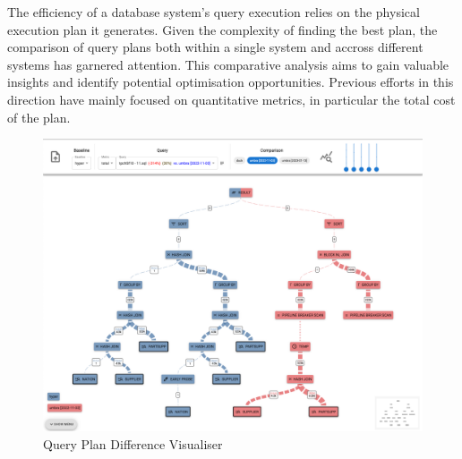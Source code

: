 The efficiency of a database system's query execution relies on the physical execution plan it generates.  Given the complexity of finding the best plan, the comparison of query plans both within a single system and accross different systems has garnered attention. This comparative analysis aims to gain valuable insights and identify potential optimisation opportunities. Previous efforts in this direction have mainly focused on quantitative metrics, in particular the total cost of the plan.
\begin{figure}[h]
    \centering
    \includegraphics[width=0.8\linewidth]{figures/semantic-diff.png}
    \caption{Query Plan Difference Visualiser}
    \label{fig:semantic-diff}
  \end{figure}

